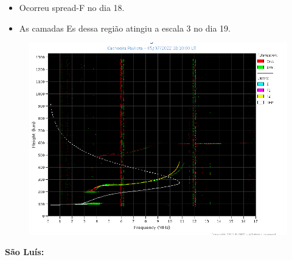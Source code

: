 \documentclass[a4paper, 10pt]{article}
\begin{document}
 \begin{itemize}
\item Ocorreu spread-F no dia 18.
\item As camadas Es dessa região atingiu a escala 3 no dia 19.  
\end{itemize}
\begin{figure}[H]
    
                        \centering
   
                             \includegraphics[width=14cm]{./figures//CachoeiraPaulista.png}

                        \end{figure}

                     
\textbf{São Luís: }
\end{document}
